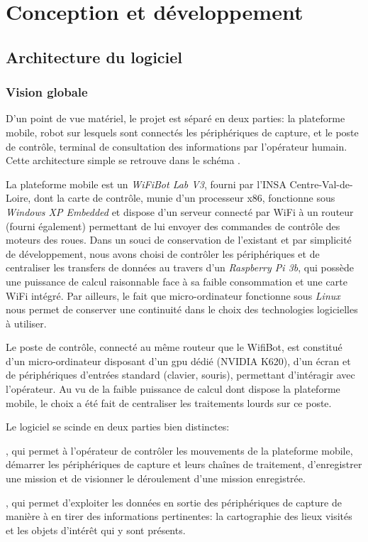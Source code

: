 \chapter{Conception et développement}

	\section{Architecture du logiciel}

		\subsection{Vision globale}
			
			D'un point de vue matériel, le projet est séparé en deux parties: la plateforme mobile, robot sur lesquels sont connectés les périphériques de capture, et le poste de contrôle, terminal de consultation des informations par l'opérateur humain. Cette architecture simple se retrouve dans le schéma \todoref.
			\par
			La plateforme mobile est un \emph{WiFiBot Lab V3}\cite{wifibot}, fourni par l'INSA Centre-Val-de-Loire, dont la carte de contrôle, munie d'un processeur x86, fonctionne sous \emph{Windows XP Embedded} et dispose d'un serveur connecté par WiFi à un routeur (fourni également) permettant de lui envoyer des commandes de contrôle des moteurs des roues. Dans un souci de conservation de l'existant et par simplicité de développement, nous avons choisi de contrôler les périphériques et de centraliser les transfers de données au travers d'un \emph{Raspberry Pi 3b}, qui possède une puissance de calcul raisonnable face à sa faible consommation et une carte WiFi intégré. Par ailleurs, le fait que micro-ordinateur fonctionne sous \emph{Linux} nous permet de conserver une continuité dans le choix des technologies logicielles à utiliser.
			\par
			Le poste de contrôle, connecté au même routeur que le WifiBot, est constitué d'un micro-ordinateur disposant d'un \gls{gpu} dédié (NVIDIA K620), d'un écran et de périphériques d'entrées standard (clavier, souris), permettant d'intéragir avec l'opérateur. Au vu de la faible puissance de calcul dont dispose la plateforme mobile, le choix a été fait de centraliser les traitements lourds sur ce poste.
			\par
			Le logiciel se scinde en deux parties bien distinctes: 
			\begin{description}[noitemsep]
				\item[l'Interface Homme-Machine], qui permet à l'opérateur de contrôler les mouvements de la plateforme mobile, démarrer les périphériques de capture et leurs chaînes de traitement, d'enregistrer une mission et de visionner le déroulement d'une mission enregistrée.
				\item[le réseau de traitement de données], qui permet d'exploiter les données en sortie des périphériques de capture de manière à en tirer des informations pertinentes: la cartographie des lieux visités et les objets d'intérêt qui y sont présents.
			\end{description}
